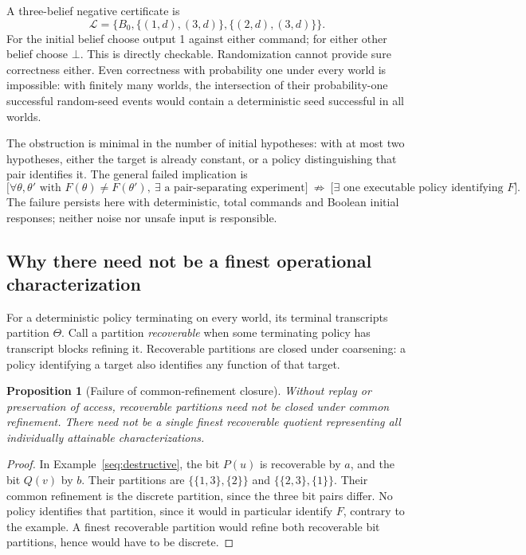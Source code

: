 \documentclass[11pt]{article}
\newtheorem{proposition}[theorem]{Proposition}
\theoremstyle{definition}
\begin{document}
A three-belief negative certificate is
\[
 \mathcal L=\{B_0,
       \{(1,d),(3,d)\},\{(2,d),(3,d)\}\}.
\]
For the initial belief choose output 1 against either command; for either
other belief choose $\bot$. This is directly checkable. Randomization cannot
provide sure correctness either. Even correctness with probability one
under every world is impossible: with finitely many worlds, the
intersection of their probability-one successful random-seed events would
contain a deterministic seed successful in all worlds.

The obstruction is minimal in the number of initial hypotheses: with at
most two hypotheses, either the target is already constant, or a policy
distinguishing that pair identifies it. The general failed implication is
\[
 \bigl[\forall\theta,\theta'\text{ with }F(\theta)\ne F(\theta'),\
       \exists\text{ a pair-separating experiment}\bigr]
 \ \not\Rightarrow\
 \bigl[\exists\text{ one executable policy identifying }F\bigr].
\]
The failure persists here with deterministic, total commands and Boolean
initial responses; neither noise nor unsafe input is responsible.

\subsection{Why there need not be a finest operational characterization}

For a deterministic policy terminating on every world, its terminal
transcripts partition $\Theta$.
Call a partition \emph{recoverable} when some terminating policy has
transcript blocks refining it. Recoverable partitions are closed under
coarsening: a policy identifying a target also identifies any function of
that target.

\begin{proposition}[Failure of common-refinement closure]
\label{seq:no-finest}
Without replay or preservation of access, recoverable partitions need not
be closed under common refinement. There need not be a single finest
recoverable quotient representing all individually attainable
characterizations.
\end{proposition}
\begin{proof}
In Example~\ref{seq:destructive}, the bit $P(u)$ is recoverable by $a$,
and the bit $Q(v)$ by $b$. Their partitions are
$\{\{1,3\},\{2\}\}$ and $\{\{2,3\},\{1\}\}$. Their common
refinement is the discrete partition, since the three bit pairs differ.
No policy identifies that partition, since it would in particular identify
$F$, contrary to the example. A finest recoverable partition would refine
both recoverable bit partitions, hence would have to be discrete.
\end{proof}
\end{document}
